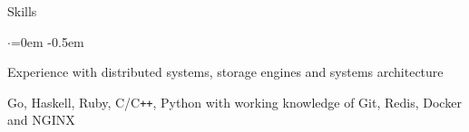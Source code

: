 \documentclass{resume} %
\begin{document}

\begin{rSection}{Skills}
  \vspace {0.5em}
  \begin{list}{$\cdot$}{\leftmargin=0em}
    \itemsep -0.5em \vspace{-0.5em}
    \item Experience with distributed systems, storage engines and systems architecture
    \item Go, Haskell, Ruby, C/C\texttt{++}, Python with working knowledge of
      Git, Redis, Docker and NGINX
  \end{list}
  \vspace{0.5em}
\end{rSection}

\end{document}
